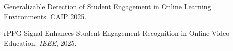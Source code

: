 







Generalizable Detection of Student Engagement in Online Learning Environments. CAIP 2025.
\href{https://doi.org/10.1007/978-3-032-05060-1_18}{\faLink}

rPPG Signal Enhances Student Engagement Recognition in Online Video Education. \textit{IEEE}, 2025.
\href{https://drive.google.com/file/d/1JwJB-9Tmqrb4YLT4s2d3BvT3DRbaJRMR/view?usp=drive_link}{\faLink}

\vspace{-8pt}
